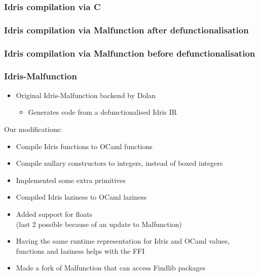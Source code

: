 \documentclass[aspectratio=169]{beamer}
\begin{document}
\begin{frame}
  \frametitle{Idris compilation via C}
  \centering
\end{frame}

\begin{frame}
  \frametitle{Idris compilation via Malfunction after defunctionalisation}
  \centering
\end{frame}

\begin{frame}
  \frametitle{Idris compilation via Malfunction before defunctionalisation}
  \centering
\end{frame}

\begin{frame}[t]
  \frametitle{Idris-Malfunction}
  \begin{itemize}
  \item Original Idris-Malfunction backend by Dolan
    \begin{itemize}
    \item Generates code from a defunctionalised Idris IR
    \end{itemize}
  \end{itemize}

  Our modifications:
  \begin{itemize}
  \item<2-> Compile Idris functions to OCaml functions
  \item<3-> Compile nullary constructors to integers, instead of
    boxed integers
  \item<4-> Implemented some extra primitives
  \item<5-> Compiled Idris laziness to OCaml laziness
  \item<6-> Added support for floats
    \\ (last 2 possible because of an update to Malfunction)
  \end{itemize}

  \begin{itemize}
  \item<7-> Having the same runtime representation for Idris and OCaml
    values, functions and laziness helps with the FFI
  \item<8-> Made a fork of Malfunction that can access Findlib packages
  \end{itemize}
\end{frame}
\end{document}
